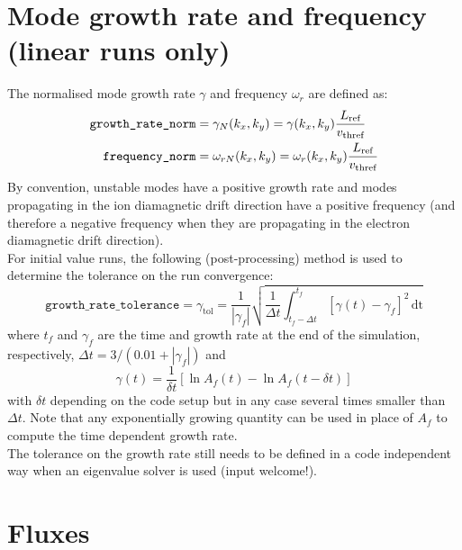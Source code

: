 \documentclass[a4paper]{report}
\begin{document}
\section{Mode growth rate and frequency (linear runs only)} \label{sec:eigenvalues}
The normalised mode growth rate $\gamma$ and frequency $\omega_r$ are defined as:
\begin{align*}
 \texttt{growth\_rate\_norm}&=\gamma_N(k_x,k_y) = \gamma(k_x,k_y) \frac{L_{\textrm{ref}}}{v_\textrm{thref}}\\
 \texttt{frequency\_norm}&=\omega_{rN}(k_x,k_y) = \omega_r(k_x,k_y) \frac{L_{\textrm{ref}}}{v_\textrm{thref}}
\end{align*}
By convention, unstable modes have a positive growth rate and modes propagating in the ion diamagnetic drift direction have a positive frequency (and therefore a negative frequency when they are propagating in the electron diamagnetic drift direction).\\
For initial value runs, the following (post-processing) method is used to determine the tolerance on the run convergence:
$$\texttt{growth\_rate\_tolerance}=\gamma_\textrm{tol} = \frac{1}{|\gamma_f|}\sqrt{\frac{1}{\Delta t}\int_{t_f-\Delta t}^{t_f} \left[\gamma(t)-\gamma_f\right]^2\,\textrm{dt}}$$
where $t_f$ and $\gamma_f$ are the time and growth rate at the end of the simulation, respectively, $\Delta t = 3/(0.01+|\gamma_f|)$ and
$$\gamma(t)=\frac{1}{\delta t}[\ln{A_f(t)}-\ln{A_f(t-\delta t)}]$$
with $\delta t$ depending on the code setup but in any case several times smaller than $\Delta t$. Note that any exponentially growing quantity can be used in place of $A_f$ to compute the time dependent growth rate.\\
The tolerance on the growth rate still needs to be defined in a code independent way when an eigenvalue solver is used (input welcome!).



\section{Fluxes} \label{sec:fluxes}
\end{document}

